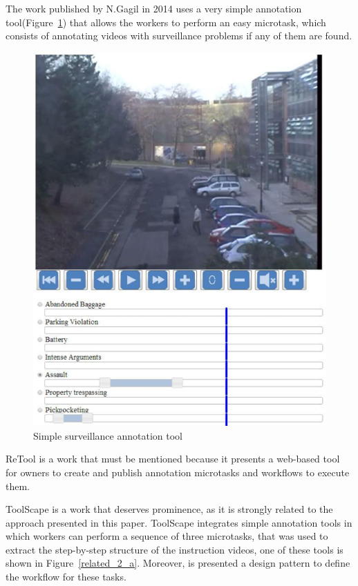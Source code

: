 The work published by N.Gagil in 2014\cite{gadgil2014web} uses a very simple annotation tool(Figure~\ref{related_d}) that allows the workers to perform an easy microtask, which consists of annotating videos with surveillance problems if any of them are found.

\begin{figure}[h]
	\centerline{\includegraphics[scale=0.3] {figure/related_d}}
	\caption{Simple surveillance annotation tool\cite{gadgil2014web}}
	\label{related_d}
\end{figure} 

ReTool\cite{Chen:2017:RIM:3025453.3025969} is a work that must be mentioned because it presents a web-based tool for owners to create and publish annotation microtasks and workflows to execute them.

ToolScape\cite{Kim:2014:JSL:2679600.2680027} is a work that deserves prominence, as it is strongly related to the approach presented in this paper. ToolScape integrates simple annotation tools in which workers can perform a sequence of three microtasks, that was used to extract the step-by-step structure of the instruction videos, one of these tools is shown in Figure~\ref{related_2_a}. Moreover, is presented a design pattern to define the workflow for these tasks.

